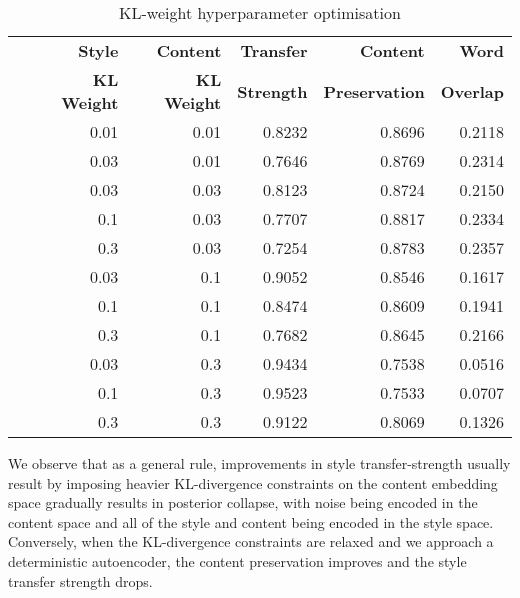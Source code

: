 \begin{table}[ht]
	\centering
	\begin{tabular}{| c | r | r | r | r | r |}
		\hline
		\multirow{2}{*}{
		} & \textbf{Style}     & \textbf{Content}   & \textbf{Transfer} & \textbf{Content}      & \textbf{Word}    \\
		  & \textbf{KL Weight} & \textbf{KL Weight} & \textbf{Strength} & \textbf{Preservation} & \textbf{Overlap} \\
		\hline
		\hline
		  & 0.01               & 0.01               & 0.8232            & 0.8696                & 0.2118           \\
		\hline
		  & 0.03               & 0.01               & 0.7646            & 0.8769                & 0.2314           \\
		\hline
		  & 0.03               & 0.03               & 0.8123            & 0.8724                & 0.2150           \\
		\hline
		  & 0.1                & 0.03               & 0.7707            & 0.8817                & 0.2334           \\
		\hline
		  & 0.3                & 0.03               & 0.7254            & 0.8783                & 0.2357           \\
		\hline
		  & 0.03               & 0.1                & 0.9052            & 0.8546                & 0.1617           \\
		\hline
		  & 0.1                & 0.1                & 0.8474            & 0.8609                & 0.1941           \\
		\hline
		  & 0.3                & 0.1                & 0.7682            & 0.8645                & 0.2166           \\
		\hline
		  & 0.03               & 0.3                & 0.9434            & 0.7538                & 0.0516           \\
		\hline
		  & 0.1                & 0.3                & 0.9523            & 0.7533                & 0.0707           \\
		\hline
		  & 0.3                & 0.3                & 0.9122            & 0.8069                & 0.1326           \\
		\hline
	\end{tabular}
	\caption{KL-weight hyperparameter optimisation}
	\label{tab:kl-hyperparam-opt}
\end{table}

We observe that as a general rule, improvements in style transfer-strength usually result by imposing heavier KL-divergence constraints on the content embedding space gradually results in posterior collapse, with noise being encoded in the content space and all of the style and content being encoded in the style space. Conversely, when the KL-divergence constraints are relaxed and we approach a deterministic autoencoder, the content preservation improves and the style transfer strength drops.


